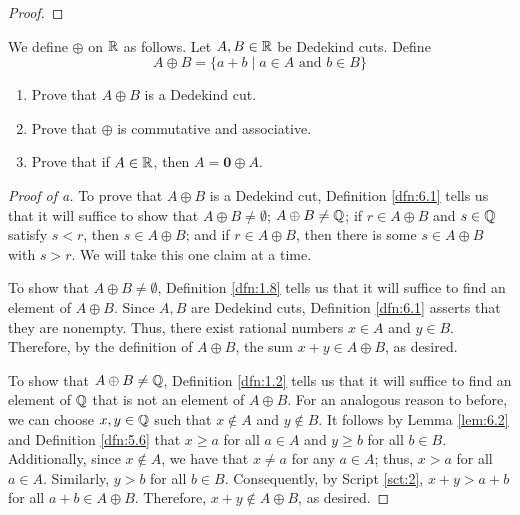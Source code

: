 \documentclass[../main.tex]{subfiles}
\begin{document}
\begin{theorem}
\begin{proof}
    \end{proof}
\end{theorem}


\begin{definition}\label{dfn:7.31}
    We define $\oplus$ on $\mathbb{R}$ as follows. Let $A,B\in\mathbb{R}$ be Dedekind cuts. Define
    \begin{equation*}
        A\oplus B = \{a+b\mid a\in A\text{ and }b\in B\}
    \end{equation*}
\end{definition}

\begin{exercise}\label{exr:7.32}\leavevmode
    \begin{enumerate}[label={(\alph*)},ref={\theexercise\alph*}]
        \item \label{exr:7.32a}Prove that $A\oplus B$ is a Dedekind cut.
        \item \label{exr:7.32b}Prove that $\oplus$ is commutative and associative.
        \item \label{exr:7.32c}Prove that if $A\in\mathbb{R}$, then $A=\bm{0}\oplus A$.
    \end{enumerate}
    \begin{proof}[Proof of a]
        To prove that $A\oplus B$ is a Dedekind cut, Definition \ref{dfn:6.1} tells us that it will suffice to show that $A\oplus B\neq\emptyset$; $A\oplus B\neq\mathbb{Q}$; if $r\in A\oplus B$ and $s\in\mathbb{Q}$ satisfy $s<r$, then $s\in A\oplus B$; and if $r\in A\oplus B$, then there is some $s\in A\oplus B$ with $s>r$. We will take this one claim at a time.\par
        To show that $A\oplus B\neq\emptyset$, Definition \ref{dfn:1.8} tells us that it will suffice to find an element of $A\oplus B$. Since $A,B$ are Dedekind cuts, Definition \ref{dfn:6.1} asserts that they are nonempty. Thus, there exist rational numbers $x\in A$ and $y\in B$. Therefore, by the definition of $A\oplus B$, the sum $x+y\in A\oplus B$, as desired.\par
        To show that $A\oplus B\neq\mathbb{Q}$, Definition \ref{dfn:1.2} tells us that it will suffice to find an element of $\mathbb{Q}$ that is not an element of $A\oplus B$. For an analogous reason to before, we can choose $x,y\in\mathbb{Q}$ such that $x\notin A$ and $y\notin B$. It follows by Lemma \ref{lem:6.2} and Definition \ref{dfn:5.6} that $x\geq a$ for all $a\in A$ and $y\geq b$ for all $b\in B$. Additionally, since $x\notin A$, we have that $x\neq a$ for any $a\in A$; thus, $x>a$ for all $a\in A$. Similarly, $y>b$ for all $b\in B$. Consequently, by Script \ref{sct:2}, $x+y>a+b$ for all $a+b\in A\oplus B$. Therefore, $x+y\notin A\oplus B$, as desired.\par

\end{proof}
\end{exercise}
\end{document}
